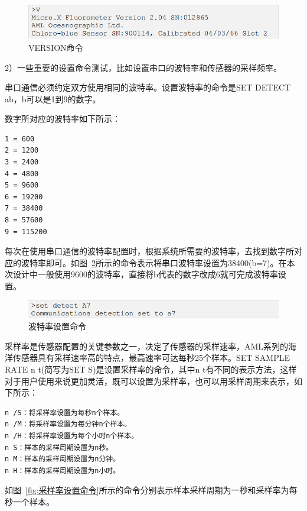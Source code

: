 \begin{figure}[ht]
    \centering
	\includegraphics[width=1\textwidth]{fig/VERSION命令.png}
	\caption{VERSION命令}
	\label{fig:VERSION命令}
\end{figure}

2）一些重要的设置命令测试，比如设置串口的波特率和传感器的采样频率。

串口通信必须约定双方使用相同的波特率。设置波特率的命令是SET DETECT ab，b可以是1到9的数字。 

数字所对应的波特率如下所示：

\begin{lstlisting}
1 = 600
2 = 1200
3 = 2400
4 = 4800
5 = 9600
6 = 19200
7 = 38400
8 = 57600
9 = 115200
\end{lstlisting}

每次在使用串口通信的波特率配置时，根据系统所需要的波特率，去找到数字所对应的波特率即可。如图~\ref{fig:波特率设置命令}所示的命令表示将串口波特率设置为38400(b=7)。在本次设计中一般使用9600的波特率，直接将b代表的数字改成6就可完成波特率设置。

\begin{figure}[ht]
    \centering
	\includegraphics[width=1\textwidth]{fig/波特率设置命令.png}
	\caption{波特率设置命令}
	\label{fig:波特率设置命令}
\end{figure}

采样率是传感器配置的关键参数之一，决定了传感器的采样速率，AML系列的海洋传感器具有采样速率高的特点，最高速率可达每秒25个样本。SET SAMPLE RATE n t(简写为SET S)是设置采样率的命令，其中n t有不同的表示方法，这样对于用户使用来说更加灵活，既可以设置为采样率，也可以用采样周期来表示，如下所示：

\begin{lstlisting}
n /S：将采样率设置为每秒n个样本。
n /M：将采样率设置为每分钟n个样本。
n /H：将采样率设置为每个小时n个样本。
n S：样本的采样周期设置为n秒。
n M：样本的采样周期设置为n分钟。
n H：样本的采样周期设置为n小时。
\end{lstlisting}

如图~\ref{fig:采样率设置命令}所示的命令分别表示样本采样周期为一秒和采样率为每秒一个样本。

